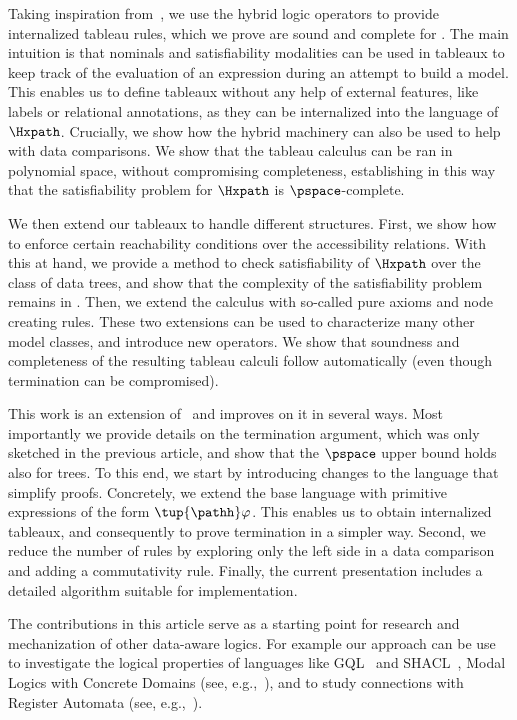 Taking inspiration from~\cite{BolanderB07}, we use the hybrid logic operators to provide internalized tableau rules, which we prove are sound and complete for \Hxpath.  The main intuition is
that nominals and satisfiability modalities can be used in tableaux to
keep track of the evaluation of an expression during an attempt to build a
model. This enables us to define tableaux without any help of external features, like labels or relational annotations, as they can be internalized into the language of $\Hxpath$. Crucially, we show how the hybrid machinery can also be used to help with data comparisons. 
We show that the tableau calculus can be ran in polynomial space,
without compromising completeness, establishing in this way that the satisfiability problem
for $\Hxpath$ is $\pspace$-complete.

We then extend our tableaux to handle different structures. First, we show how to enforce certain reachability conditions over the accessibility relations. With this at hand, we provide a method to check satisfiability of $\Hxpath$ over the class of data trees, and show that the complexity of the satisfiability problem remains in \pspace. 
Then, we extend the calculus with so-called pure axioms and node creating rules. These two extensions can be used to characterize many other model classes, and introduce new operators. We show that soundness and  completeness of the resulting tableau calculi follow automatically (even though termination can be compromised). 

This work is an extension of~\cite{ArecesFS17} and improves on it in several ways.  Most importantly we provide details on the termination argument, which was only sketched in the previous article, and show that the $\pspace$ upper bound holds also for trees. To this end, we start by introducing changes to the language that simplify proofs. Concretely, we extend the base language with primitive expressions of the form $\tup{\pathh}\varphi$. This enables us to obtain internalized tableaux, and consequently to prove termination  in a simpler way. Second, we reduce the number of rules by exploring only the left side in a data comparison and adding a commutativity rule. Finally, the current presentation includes a detailed algorithm suitable for implementation.

The contributions in this article serve as a starting point for research and mechanization of other data-aware logics. For example our approach can be use to investigate the logical properties of languages like GQL~\cite{FrancisGGLMMMPR23,FrancisGGLMMMPR23b} and SHACL~\cite{Ortiz23,Ahmetaj0S23}, Modal Logics with Concrete Domains (see, e.g.,~\cite{DemriQ21}), and to study connections with Register Automata (see, e.g.,~\cite{KaminskiF94}).

